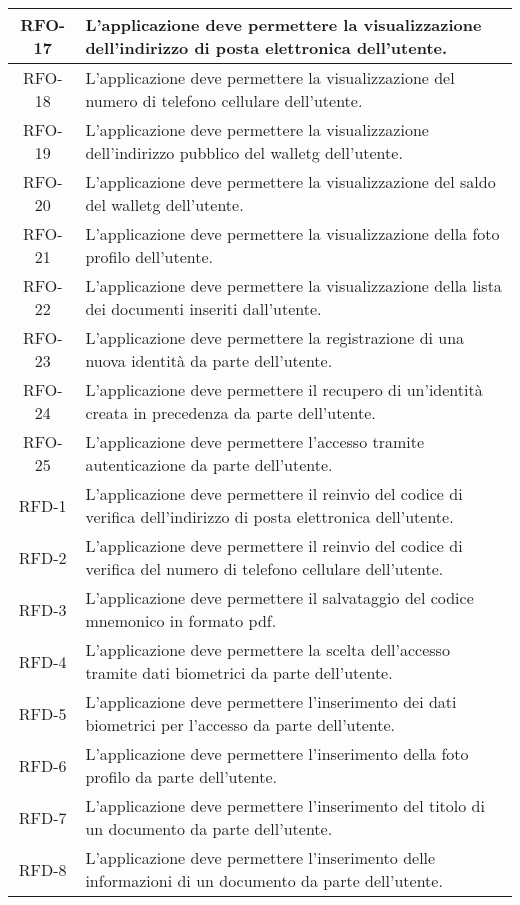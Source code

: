 \begin{longtable}{|c|p{10.5cm}|}
	\hline
	RFO-17    & L'applicazione deve permettere la visualizzazione dell'indirizzo di posta elettronica dell'utente. \\
	\hline
	RFO-18    & L'applicazione deve permettere la visualizzazione del numero di telefono cellulare dell'utente. \\
	\hline
	RFO-19    & L'applicazione deve permettere la visualizzazione dell'indirizzo pubblico del \gls{walletg} dell'utente. \\
	\hline
	RFO-20    & L'applicazione deve permettere la visualizzazione del saldo del \gls{walletg} dell'utente. \\
	\hline
	RFO-21    & L'applicazione deve permettere la visualizzazione della foto profilo dell'utente. \\
	\hline
	RFO-22    & L'applicazione deve permettere la visualizzazione della lista dei documenti inseriti dall'utente. \\
	\hline
	RFO-23    & L'applicazione deve permettere la registrazione di una nuova identità da parte dell'utente. \\
	\hline
	RFO-24    & L'applicazione deve permettere il recupero di un'identità creata in precedenza da parte dell'utente. \\
	\hline
	RFO-25    & L'applicazione deve permettere l'accesso tramite autenticazione da parte dell'utente. \\
	\hline
	RFD-1     & L'applicazione deve permettere il reinvio del codice di verifica dell'indirizzo di posta elettronica dell'utente. \\
	\hline
	RFD-2     & L'applicazione deve permettere il reinvio del codice di verifica del numero di telefono cellulare dell'utente. \\
	\hline
	RFD-3     & L'applicazione deve permettere il salvataggio del codice mnemonico in formato \gls{pdf}. \\
	\hline
	RFD-4     & L'applicazione deve permettere la scelta dell'accesso tramite dati biometrici da parte dell'utente. \\
	\hline
	RFD-5     & L'applicazione deve permettere l'inserimento dei dati biometrici per l'accesso da parte dell'utente. \\
	\hline
	RFD-6     & L'applicazione deve permettere l'inserimento della foto profilo da parte dell'utente. \\
	\hline
	RFD-7     & L'applicazione deve permettere l'inserimento del titolo di un documento da parte dell'utente. \\
	\hline
	RFD-8     & L'applicazione deve permettere l'inserimento delle informazioni di un documento da parte dell'utente. \\

\end{longtable}
